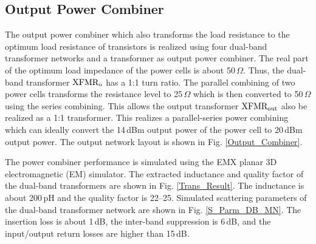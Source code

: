 \documentclass{IEEEtran}
\begin{document}

\subsection{Output Power Combiner}

The output power combiner which also transforms the load resistance to the optimum load resistance of transistors is realized using four dual-band transformer networks and a transformer as output power combiner. The real part of the optimum load impedance of the power cells is about 50\,$\Omega$. Thus, the dual-band transformer $\rm XFMR_o$ has a 1:1 turn ratio. The parallel combining of two power cells transforms the resistance level to 25\,$\Omega$ which is then converted to 50\,$\Omega$ using the series combining. This allows the output transformer $\rm XFMR_{out}$ also be realized as a 1:1 transformer. This realizes a parallel-series power combining which can ideally convert the 14\,dBm output power of the power cell to 20\,dBm output power. The output network layout is shown in Fig. \ref{Output_Combiner}.

The power combiner performance is simulated using the EMX planar 3D electromagnetic (EM) simulator. The extracted inductance and quality factor of the dual-band transformers are shown in Fig. \ref{Trans_Result}. The inductance is about 200\,pH and the quality factor is 22--25. Simulated scattering parameters of the dual-band transformer network are shown in Fig. \ref{S_Parm_DB_MN}. The insertion loss is about 1\,dB, the inter-band suppression is 6\,dB, and the input/output return losses are higher than 15\,dB. 


\end{document}
